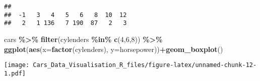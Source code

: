 \documentclass[
]{article}
\newenvironment{Shaded}{\begin{snugshade}}{\end{snugshade}}
\newcommand{\AttributeTok}[1]{\textcolor[rgb]{0.13,0.29,0.53}{#1}}
\newcommand{\DecValTok}[1]{\textcolor[rgb]{0.00,0.00,0.81}{#1}}
\newcommand{\FunctionTok}[1]{\textcolor[rgb]{0.13,0.29,0.53}{\textbf{#1}}}
\newcommand{\NormalTok}[1]{#1}
\newcommand{\SpecialCharTok}[1]{\textcolor[rgb]{0.81,0.36,0.00}{\textbf{#1}}}
\begin{document}
\begin{verbatim}
## 
##  -1   3   4   5   6   8  10  12 
##   2   1 136   7 190  87   2   3
\end{verbatim}

\begin{Shaded}
\begin{Highlighting}[]
\NormalTok{cars }\SpecialCharTok{\%\textgreater{}\%} \FunctionTok{filter}\NormalTok{(cylenders }\SpecialCharTok{\%in\%} \FunctionTok{c}\NormalTok{(}\DecValTok{4}\NormalTok{,}\DecValTok{6}\NormalTok{,}\DecValTok{8}\NormalTok{)) }\SpecialCharTok{\%\textgreater{}\%} \FunctionTok{ggplot}\NormalTok{(}\FunctionTok{aes}\NormalTok{(}\AttributeTok{x=}\FunctionTok{factor}\NormalTok{(cylenders), }\AttributeTok{y=}\NormalTok{horsepower))}\SpecialCharTok{+}\FunctionTok{geom\_boxplot}\NormalTok{()}
\end{Highlighting}
\end{Shaded}

\texttt{[image: Cars\_Data\_Visualisation\_R\_files/figure-latex/unnamed-chunk-12-1.pdf]}
\end{document}
